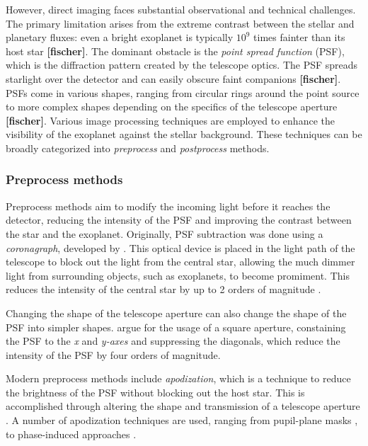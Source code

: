 \documentclass[preprint,longauthor]{aastex631}
\numberwithin{equation}{section}
\begin{document}
However, direct imaging faces substantial observational and technical challenges. The primary limitation arises from the extreme contrast between the stellar and planetary fluxes: even a bright exoplanet is typically $10^{9}$ times fainter than its host star \textbf{[fischer]}. The dominant obstacle is the \textit{point spread function} (PSF), which is the diffraction pattern created by the telescope optics. The PSF spreads starlight over the detector and can easily obscure faint companions \textbf{[fischer]}. PSFs come in various shapes, ranging from circular rings around the point source to more complex shapes depending on the specifics of the telescope aperture \textbf{[fischer]}. Various image processing techniques are employed to enhance the visibility of the exoplanet against the stellar background. These techniques can be broadly categorized into \textit{preprocess} and \textit{postprocess} methods.

\subsubsection{Preprocess methods}

Preprocess methods aim to modify the incoming light before it reaches the detector, reducing the intensity of the PSF and improving the contrast between the star and the exoplanet. Originally, PSF subtraction was done using a \textit{coronagraph}, developed by \citet{lyotStudySolarCorona1939}. This optical device is placed in the light path of the telescope to block out the light from the central star, allowing the much dimmer light from surrounding objects, such as exoplanets, to become promiment. This reduces the intensity of the central star by up to 2 orders of magnitude \citep{chauvinDirectImagingExoplanets2023}.

Changing the shape of the telescope aperture can also change the shape of the PSF into simpler shapes. \citet{zanoniReductionDiffractedLight1965} argue for the usage of a square aperture, constaining the PSF to the \textit{x} and \textit{y-axes} and suppressing the diagonals, which reduce the intensity of the PSF by four orders of magnitude.

Modern preprocess methods include \textit{apodization}, which is a technique to reduce the brightness of the PSF without blocking out the host star. This is accomplished through altering the shape and transmission of a telescope aperture \citep{nisensonDetectionEarthlikePlanets2001}. A number of apodization techniques are used, ranging from pupil-plane masks \citep{reddyApodizationPupilsDesign2018}, to phase-induced approaches \citep{guyonExoplanetImagingPhaseinduced2005}.
\end{document}
